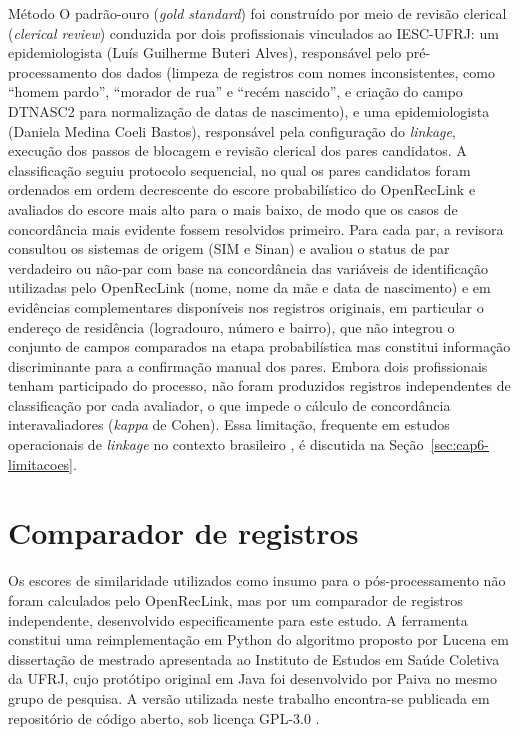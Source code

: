 \begin{chapter}{Método}
O padrão-ouro (\textit{gold standard}) foi construído por meio de revisão clerical (\textit{clerical review}) conduzida por dois profissionais vinculados ao IESC-UFRJ: um epidemiologista (Luís Guilherme Buteri Alves), responsável pelo pré-processamento dos dados (limpeza de registros com nomes inconsistentes, como ``homem pardo'', ``morador de rua'' e ``recém nascido'', e criação do campo DTNASC2 para normalização de datas de nascimento), e uma epidemiologista (Daniela Medina Coeli Bastos), responsável pela configuração do \textit{linkage}, execução dos passos de blocagem e revisão clerical dos pares candidatos. A classificação seguiu protocolo sequencial, no qual os pares candidatos foram ordenados em ordem decrescente do escore probabilístico do OpenRecLink e avaliados do escore mais alto para o mais baixo, de modo que os casos de concordância mais evidente fossem resolvidos primeiro. Para cada par, a revisora consultou os sistemas de origem (SIM e Sinan) e avaliou o status de par verdadeiro ou não-par com base na concordância das variáveis de identificação utilizadas pelo OpenRecLink (nome, nome da mãe e data de nascimento) e em evidências complementares disponíveis nos registros originais, em particular o endereço de residência (logradouro, número e bairro), que não integrou o conjunto de campos comparados na etapa probabilística mas constitui informação discriminante para a confirmação manual dos pares. Embora dois profissionais tenham participado do processo, não foram produzidos registros independentes de classificação por cada avaliador, o que impede o cálculo de concordância interavaliadores (\textit{kappa} de Cohen). Essa limitação, frequente em estudos operacionais de \textit{linkage} no contexto brasileiro \cite{Coeli2021suboptimal}, é discutida na Seção~\ref{sec:cap6-limitacoes}.

\section{Comparador de registros}\label{sec:comparador-registros}

Os escores de similaridade utilizados como insumo para o pós-processamento não foram calculados pelo OpenRecLink, mas por um comparador de registros independente, desenvolvido especificamente para este estudo. A ferramenta constitui uma reimplementação em Python do algoritmo proposto por Lucena \citeyearpar{Lucena2013algoritmos} em dissertação de mestrado apresentada ao Instituto de Estudos em Saúde Coletiva da UFRJ, cujo protótipo original em Java foi desenvolvido por Paiva \citeyearpar{Paiva2025comparador} no mesmo grupo de pesquisa. A versão utilizada neste trabalho encontra-se publicada em repositório de código aberto, sob licença GPL-3.0 \cite{Jardim2024comparador}.


\end{chapter}
